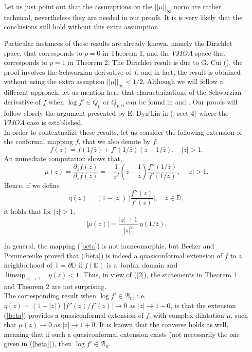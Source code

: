 \documentclass[12pt,a4paper]{article}
\theoremstyle{definition}
\theoremstyle{remark}
\newcommand{\D}{\mathbb{D}}
\newcommand{\T}{\mathbb{T}}
\numberwithin{komcounter}{section}
\begin{document}
Let us just point out that the  assumptions on the $||\mu||_\infty$ norm are rather technical, nevertheless they are needed in our proofs. It is is very likely that the conclusions  still hold without this extra assumption. 
	 
	Particular instances of these results are already known, namely  the Dirichlet space, that corresponds to $p=0$ in Theorem 1, and  the $VMOA$ space that corresponds to $p=1$ in Theorem 2. The Dirichlet result is  due to G. Cui  (\cite{c}), the proof involves the  Schwarzian derivative of $f$, and in fact, the result is obtained without using  the extra assuption $||\mu||_\infty < 1/2$. Although we will follow a different   approach, let us  mention here that  characterizations of the Schwarzian derivative of $f$ when $\log f'\in Q_p$ or $Q_{p,0}$ can be found in \cite{PP} and \cite{PR}. Our  proofs will follow closely the argument presented by E. Dyn'kin in (\cite{d}, sect 4) where the $VMOA$ case is established.\\
	\indent
In order to contextualize these results, let us consider the following extension of the conformal mapping $f$, that we also denote by $f$:
\begin{equation}\label{beta}
f(z) = f(1/\bar{z}) + f'(1/\bar{z})(z-1/\bar{z}), \quad  |z| > 1.
\end{equation}
\noindent
An immediate computation shows that,
$$
\mu(z)=\frac{\partial_{\bar{z}} f(z)}{\partial_z f(z)}= -\frac{1}{\bar{z}^2}\left(z- \frac{1}{\bar{z}}\right) \frac{f''(1/\bar{z})}{f'(1/\bar{z})},  \quad  |z| > 1.
$$
\noindent
Hence, if we define 
$$
\eta(z) =(1 - |z|)~\bigg\vert\frac{f''(z)}{f'(z)}\bigg\vert, \quad  z\in \D,
$$
it holds that for  $|z|> 1$, 
\begin{equation}\label{2}
|\mu(z)|= \frac{|z|+1}{|z|^2}~ \eta(1/\bar{z}).
\end{equation}

In general, the mapping (\ref{beta}) is not homeomorphic, but Becker and Pommerenke \cite{bp} proved that (\ref{beta}) is indeed a quasiconformal extension
of $f$ to a neighborhood of $\T=\partial \D$ if $f(\D)$ is a Jordan domain and $\limsup_{|z|{\rightarrow 1-}}\eta(z) < 1$. Thus, in view of (\ref{2}), the statements in Theorem 1 and Theorem 2 are not surprising. \\
\indent 
The corresponding result when	$\log{f'}\in \mathcal{B}_0$, i.e. $ \eta(z)= (1-|z|)~ |f''(z)/f'(z)| \to 0$ as $|z|\to 1-0$, is that the extension (\ref{beta}) provides a quasiconformal extension of $f$, with complex dilatation $\mu$, such that  $\mu(z) \to 0$ as $|z|\to 1+0$. It is known  that the converse holds as well, meaning that if such a quasiconformal extension exists (not necessarily the one given in (\ref{beta})), then 	$\log{f'}\in \mathcal{B}_0$. 
\end{document}
